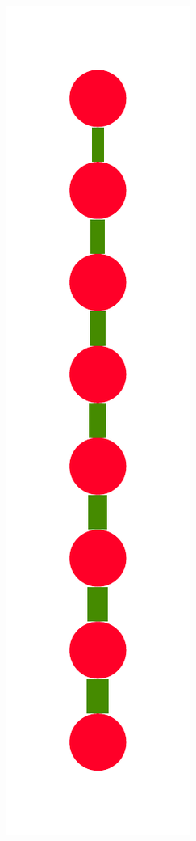 \documentclass[a4paper,10pt]{article}
\begin{document}
\begin{figure}
{    \includegraphics[scale=.14]{./figures/6-3-recursion-data-8.pdf}
    \label{fig:exp-simple-recursion-data}
    }
    \qquad
\end{figure}
\end{document}
